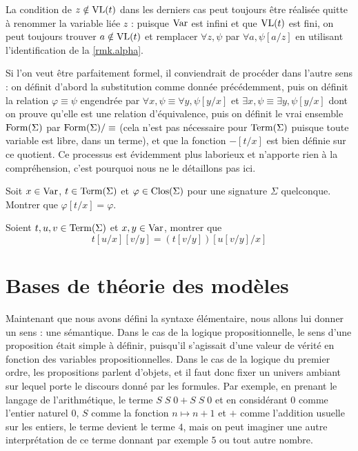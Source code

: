\begin{remark}
  La condition de $z\notin\operatorname{VL}(t)$ dans les derniers cas peut toujours être
  réalisée quitte à renommer la variable liée $z$ : puisque $\operatorname{Var}$ est infini
  et que $\operatorname{VL}(t)$ est fini, on peut toujours trouver $a\notin\operatorname{VL}(t)$ et
  remplacer $\forall z, \psi$ par $\forall a, \psi[a/z]$ en utilisant
  l'identification de la \cref{rmk.alpha}.

  Si l'on veut être parfaitement formel, il conviendrait de procéder dans
  l'autre sens : on définit d'abord la substitution comme donnée précédemment,
  puis on définit la relation $\varphi \equiv \psi$ engendrée par
  $\forall x, \psi \equiv \forall y, \psi[y/x]$ et
  $\exists x,\psi \equiv\exists y, \psi[y/x]$ dont on prouve qu'elle est une
  relation d'équivalence, puis on définit le \og vrai\fg{} ensemble
  $\operatorname{Form}(\Sigma)$ par $\operatorname{Form}(\Sigma)/ \equiv$ (cela n'est pas nécessaire
  pour $\operatorname{Term}(\Sigma)$ puisque toute variable est libre, dans un terme), et que
  la fonction $-[t/x]$ est bien définie sur ce quotient. Ce processus est
  évidemment plus laborieux et n'apporte rien à la compréhension, c'est pourquoi
  nous ne le détaillons pas ici.
\end{remark}

\begin{exercise}
  Soit $x\in \operatorname{Var}$, $t\in\operatorname{Term}(\Sigma)$ et $\varphi\in\operatorname{Clos}(\Sigma)$ pour une
  signature $\Sigma$ quelconque. Montrer que $\varphi[t/x] = \varphi$.
\end{exercise}

\begin{exercise}
  Soient $t,u,v\in\operatorname{Term}(\Sigma)$ et $x,y\in\operatorname{Var}$, montrer que
  \[t[u/x][v/y] = (t[v/y])[u[v/y]/x]\]
\end{exercise}

\section{Bases de théorie des modèles}

Maintenant que nous avons défini la syntaxe élémentaire, nous allons lui donner
un sens : une sémantique. Dans le cas de la logique propositionnelle, le sens
d'une proposition était simple à définir, puisqu'il s'agissait d'une valeur de
vérité en fonction des variables propositionnelles. Dans le cas de la logique du
premier ordre, les propositions parlent d'objets, et il faut donc fixer un
univers ambiant sur lequel porte le discours donné par les formules. Par
exemple, en prenant le langage de l'arithmétique, le terme $S\;S\;0 + S\;S\;0$
et en considérant $0$ comme l'entier naturel $0$, $S$ comme la fonction
$n \mapsto n + 1$ et $+$ comme l'addition usuelle sur les entiers, le terme
devient le terme $4$, mais on peut imaginer une autre interprétation de ce terme
donnant par exemple $5$ ou tout autre nombre.

